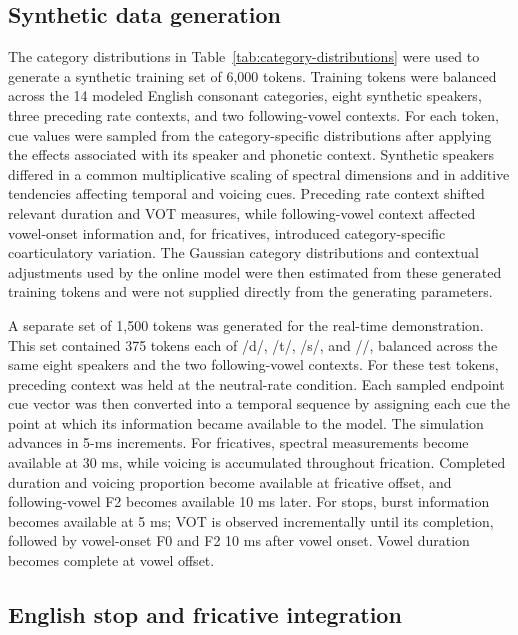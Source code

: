 \documentclass[12pt]{article}
\begin{document}
\subsection{Synthetic data generation}

The category distributions in Table~\ref{tab:category-distributions} were used to generate a synthetic training set of 6,000 tokens.
%
Training tokens were balanced across the 14 modeled English consonant categories, eight synthetic speakers, three preceding rate contexts, and two following-vowel contexts.
%
For each token, cue values were sampled from the category-specific distributions after applying the effects associated with its speaker and phonetic context.
%
Synthetic speakers differed in a common multiplicative scaling of spectral dimensions and in additive tendencies affecting temporal and voicing cues.
%
Preceding rate context shifted relevant duration and VOT measures, while following-vowel context affected vowel-onset information and, for fricatives, introduced category-specific coarticulatory variation.
%
The Gaussian category distributions and contextual adjustments used by the online model were then estimated from these generated training tokens and were not supplied directly from the generating parameters.

A separate set of 1,500 tokens was generated for the real-time demonstration.
%
This set contained 375 tokens each of /d/, /t/, /s/, and /\textesh/, balanced across the same eight speakers and the two following-vowel contexts.
%
For these test tokens, preceding context was held at the neutral-rate condition.
%
Each sampled endpoint cue vector was then converted into a temporal sequence by assigning each cue the point at which its information became available to the model.
%
The simulation advances in 5-ms increments.
%
For fricatives, spectral measurements become available at 30 ms, while voicing is accumulated throughout frication.
%
Completed duration and voicing proportion become available at fricative offset, and following-vowel F2 becomes available 10 ms later.
%
For stops, burst information becomes available at 5 ms; VOT is observed incrementally until its completion, followed by vowel-onset F0 and F2 10 ms after vowel onset.
%
Vowel duration becomes complete at vowel offset.

\subsection{English stop and fricative integration}
\end{document}

